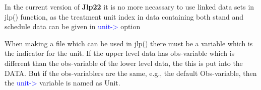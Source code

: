 \begin{note}
In the current version of \textbf{Jlp22} it is no more necassary to use linked data sets in
\textcolor{VioletRed}{jlp}() function, as the treatment unit index in data containing both
stand and schedule data can be given in \textcolor{blue}{unit->} option
\end{note}
\begin{note}
When making a file which can be used in \textcolor{VioletRed}{jlp}() there must be a variable which is the indicator for the unit.
If the upper level data has obs-variable which is different than the obs-variable of the lower level
data, the this is put into the DATA. But if the obs-variablers are the same, e.g., the default Obs-variable,
then the \textcolor{blue}{unit->} variable is named as Unit.
\end{note}

